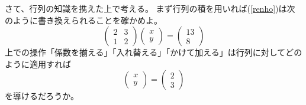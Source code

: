\documentclass[10pt]{jsreport}
\theoremstyle{definition}%
\newcommand{\kakko}[1]{\left(#1 \right)} %
\numberwithin{equation}{section}%
\begin{document}
さて、行列の知識を携えた上で考える。
まず行列の積を用いれば(\ref{renho})は次のように書き換えられることを確かめよ。
\begin{equation}
  \kakko{\begin{matrix}
    2 & 3\\
    1 & 2
  \end{matrix}}
  \kakko{\begin{matrix}
    x\\
    y
  \end{matrix}}
  =
  \kakko{\begin{matrix}
    13\\
    8
  \end{matrix}}
\end{equation}
上での操作「係数を揃える」「入れ替える」「かけて加える」は行列に対してどのように適用すれば
\begin{equation}
  \kakko{\begin{matrix}
    x\\
    y
  \end{matrix}}
  =\kakko{\begin{matrix}
    2\\
    3
  \end{matrix}}
\end{equation}
を導けるだろうか。
\end{document}
